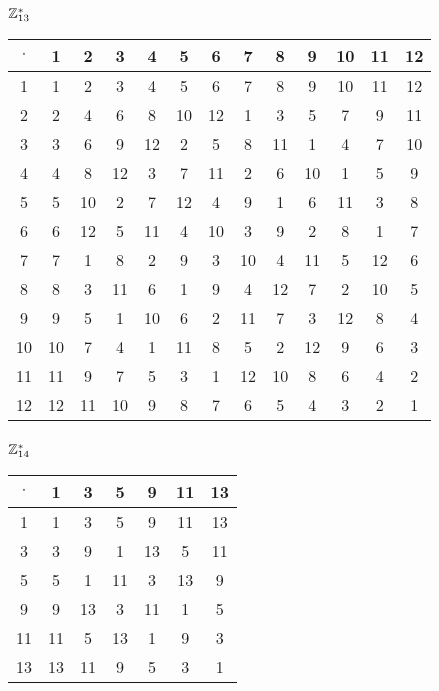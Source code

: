 \subsubsection{$\mathbb{Z}_{13}^*$}
\begin{tabular}{|c|c|c|c|c|c|c|c|c|c|c|c|c|}
\hline $\cdot$  & 1 & 2 & 3 & 4 & 5 & 6 & 7 & 8 & 9 & 10 & 11 & 12\\
\hline 1 & 1 & 2 & 3 & 4 & 5 & 6 & 7 & 8 & 9 & 10 & 11 & 12\\
\hline 2 & 2 & 4 & 6 & 8 & 10 & 12 & 1 & 3 & 5 & 7 & 9 & 11\\
\hline 3 & 3 & 6 & 9 & 12 & 2 & 5 & 8 & 11 & 1 & 4 & 7 & 10\\
\hline 4 & 4 & 8 & 12 & 3 & 7 & 11 & 2 & 6 & 10 & 1 & 5 & 9\\
\hline 5 & 5 & 10 & 2 & 7 & 12 & 4 & 9 & 1 & 6 & 11 & 3 & 8\\
\hline 6 & 6 & 12 & 5 & 11 & 4 & 10 & 3 & 9 & 2 & 8 & 1 & 7\\
\hline 7 & 7 & 1 & 8 & 2 & 9 & 3 & 10 & 4 & 11 & 5 & 12 & 6\\
\hline 8 & 8 & 3 & 11 & 6 & 1 & 9 & 4 & 12 & 7 & 2 & 10 & 5\\
\hline 9 & 9 & 5 & 1 & 10 & 6 & 2 & 11 & 7 & 3 & 12 & 8 & 4\\
\hline 10 & 10 & 7 & 4 & 1 & 11 & 8 & 5 & 2 & 12 & 9 & 6 & 3\\
\hline 11 & 11 & 9 & 7 & 5 & 3 & 1 & 12 & 10 & 8 & 6 & 4 & 2\\
\hline 12 & 12 & 11 & 10 & 9 & 8 & 7 & 6 & 5 & 4 & 3 & 2 & 1\\
\hline
\end{tabular}


\subsubsection{$\mathbb{Z}_{14}^*$}
\begin{tabular}{|c|c|c|c|c|c|c|}
\hline $\cdot$  & 1 & 3 & 5 & 9 & 11 & 13\\
\hline 1 & 1 & 3 & 5 & 9 & 11 & 13\\
\hline 3 & 3 & 9 & 1 & 13 & 5 & 11\\
\hline 5 & 5 & 1 & 11 & 3 & 13 & 9\\
\hline 9 & 9 & 13 & 3 & 11 & 1 & 5\\
\hline 11 & 11 & 5 & 13 & 1 & 9 & 3\\
\hline 13 & 13 & 11 & 9 & 5 & 3 & 1\\
\hline
\end{tabular}



